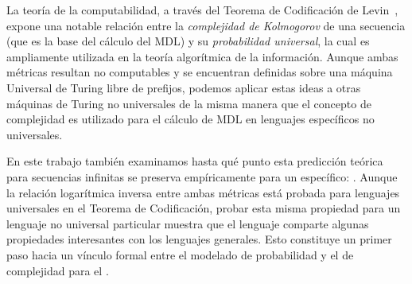 
La teoría de la computabilidad, a través del Teorema de Codificación de Levin~\cite{levin1974laws}, expone una notable relación entre la {\em complejidad de Kolmogorov} de una secuencia (que es la base del cálculo del MDL) y su {\em probabilidad universal}, la cual es ampliamente utilizada en la teoría algorítmica de la información. Aunque ambas métricas resultan no computables y se encuentran definidas sobre una máquina Universal de Turing libre de prefijos, podemos aplicar estas ideas a otras máquinas de Turing no universales de la misma manera que el concepto de complejidad es utilizado para el cálculo de MDL en lenguajes específicos no universales. 


En este trabajo también examinamos hasta qué punto esta predicción teórica para secuencias infinitas se preserva empíricamente para un \lot específico: \gramgeo. Aunque la relación logarítmica inversa entre ambas métricas está probada para lenguajes universales en el Teorema de Codificación, probar esta misma propiedad para un lenguaje no universal particular muestra que el lenguaje comparte algunas propiedades interesantes con los lenguajes generales. Esto constituye un primer paso hacia un vínculo formal entre el modelado de probabilidad y el de complejidad para el \lot.

